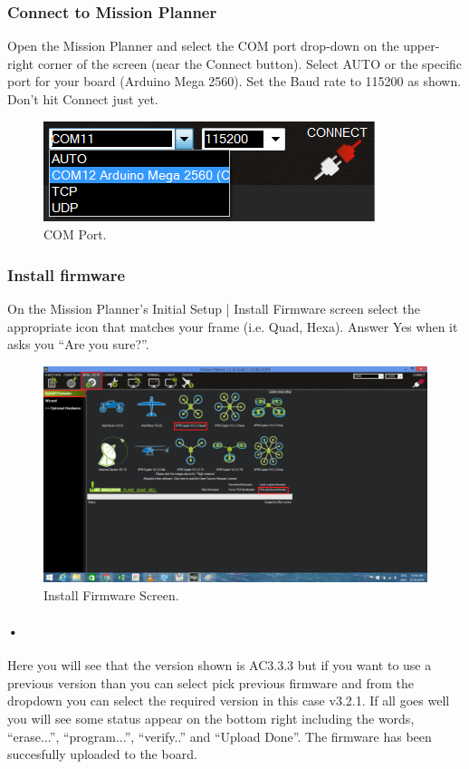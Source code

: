 \documentclass[11pt,a4paper]{article}
\begin{document}
		\subsubsection{Connect to Mission Planner}
Open the Mission Planner and select the COM port drop-down on the upper-right corner of the screen (near the Connect button). Select AUTO or the specific port for your board (Arduino Mega 2560). Set the Baud rate to 115200 as shown. Don’t hit Connect just yet.
\begin{figure}[H]
	 	\centering
		\includegraphics[scale=0.6]{baud}
	 	\caption{COM Port.}
		\end{figure}	
		
		\subsubsection{Install firmware}
On the Mission Planner’s Initial Setup | Install Firmware screen select the appropriate icon that matches your frame (i.e. Quad, Hexa). Answer Yes when it asks you “Are you sure?”.
		\begin{figure}[H]
	 	\centering
		\includegraphics[scale=0.40]{firmware}
	 	\caption{Install Firmware Screen.}
		\end{figure}
		\paragraph{•}Here you will see that the version shown is AC3.3.3 but if you want to use a previous version than you can select pick previous firmware and from the dropdown you can select the required version in this case v3.2.1. If all goes well you will see some status appear on the bottom right including the words, “erase...”, “program...”, “verify..” and “Upload Done”. The firmware has been succesfully uploaded to the board.
		
\end{document}
